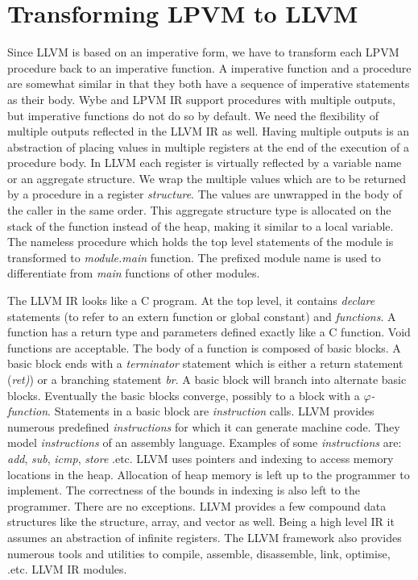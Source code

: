 \section{Transforming LPVM to LLVM}
\label{sec:lpvm_to_llvm}

Since LLVM is based on an imperative form, we have to transform each LPVM
procedure back to an imperative function. A imperative function and a procedure
are somewhat similar in that they both have a sequence of imperative statements
as their body. Wybe and LPVM IR support procedures with multiple outputs, but
imperative functions do not do so by default. We need the flexibility of
multiple outputs reflected in the LLVM IR as well. Having multiple outputs is
an abstraction of placing values in multiple registers at the end of the
execution of a procedure body. In LLVM each register is virtually reflected by
a variable name or an aggregate structure. We wrap the multiple values which
are to be returned by a procedure in a register \textit{structure}. The values
are unwrapped in the body of the caller in the same order. This aggregate
structure type is allocated on the stack of the function instead of the heap,
making it similar to a local variable. The nameless procedure which holds the
top level statements of the module is transformed to \textit{module.main}
function. The prefixed module name is used to differentiate from \textit{main}
functions of other modules.

The LLVM IR looks like a C program. At the top level, it contains
\textit{declare} statements (to refer to an extern function or global constant)
and \textit{functions}. A function has a return type and parameters defined
exactly like a C function. Void functions are acceptable. The body of a
function is composed of basic blocks. A basic block ends with a
\textit{terminator} statement which is either a return statement
(\textit{ret)}) or a branching statement \textit{br}. A basic block will branch
into alternate basic blocks. Eventually the basic blocks converge, possibly to
a block with a $\varphi$\textit{-function}. Statements in a basic block are
\textit{instruction} calls. LLVM provides numerous predefined
\textit{instructions} for which it can generate machine code. They model
\textit{instructions} of an assembly language. Examples of some
\textit{instructions} are: \textit{add}, \textit{sub}, \textit{icmp},
\textit{store} .etc. LLVM uses pointers and indexing to access memory locations
in the heap. Allocation of heap memory is left up to the programmer to
implement. The correctness of the bounds in indexing is also left to the
programmer. There are no exceptions. LLVM provides a few compound data
structures like the structure, array, and vector as well. Being a high level IR
it assumes an abstraction of infinite registers. The LLVM framework also
provides numerous tools and utilities to compile, assemble, disassemble, link,
optimise, .etc. LLVM IR modules.

